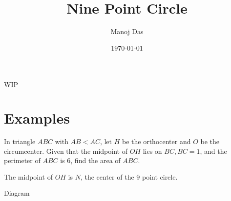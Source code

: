 \documentclass[11pt,twoside]{scrartcl}
\begin{document}
\title{Nine Point Circle}

\author{Manoj Das}
\date{\today}

\maketitle


\TBD WIP
\section{Examples}
\begin{example}
In triangle $ABC$ with $AB < AC$, let $H$ be the orthocenter and $O$ be the circumcenter. Given that the
midpoint of $OH$ lies on $BC, BC = 1$, and the perimeter of $ABC$ is 6, find the area of $ABC$.    
\end{example}
\begin{remark}
    The midpoint of $OH$ is $N$, the center of the 9 point circle.
\end{remark}
\TBD Diagram
\begin{soln}
\TBD
\end{soln}
\begin{soln}[Trig]
\TBD
\end{soln}

\begin{thebibliography}{99}
     \TBD
\end{thebibliography}
\end{document}
